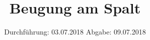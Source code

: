 

\subject{V406}
\title{Beugung am Spalt}
\date{%
  Durchführung: 03.07.2018
  \hspace{3em}
  Abgabe: 09.07.2018
}



\maketitle
\thispagestyle{empty}
\tableofcontents
\newpage






\printbibliography{}


